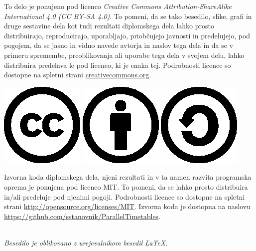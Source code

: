 \documentclass[a4paper,12pt,openany]{book}
\newcommand{\CcImageCc}[1]{%
	\includegraphics[scale=#1]{cc.eps}%
}
\newcommand{\CcImageBy}[1]{%
	\includegraphics[scale=#1]{by.eps}%
}
\newcommand{\CcImageSa}[1]{%
	\includegraphics[scale=#1]{sa.eps}%
}
\begin{document}
\thispagestyle{empty}

\vspace*{5cm}
{\small \noindent
To delo je ponujeno pod licenco \textit{Creative Commons Attribution-ShareAlike International 4.0 (CC BY-SA 4.0)}.
To pomeni, da se tako besedilo, slike, grafi in druge sestavine dela kot tudi rezultati diplomskega dela lahko prosto distribuirajo,
reproducirajo, uporabljajo, priobčujejo javnosti in predelujejo, pod pogojem, da se jasno in vidno navede avtorja in naslov tega
dela in da se v primeru spremembe, preoblikovanja ali uporabe tega dela v svojem delu, lahko distribuira predelava le pod
licenco, ki je enaka tej.
Podrobnosti licence so dostopne na spletni strani \href{http://creativecommons.org/licenses/by-sa/4.0/}{creativecommons.org}.

\begin{center}%
\CcImageCc{0.4}\hspace*{1ex}\CcImageBy{0.4}\hspace*{1ex}\CcImageSa{0.4}%
\end{center}
}

\vspace*{1.5cm}
{\small \noindent
Izvorna koda diplomskega dela, njeni rezultati in v ta namen razvita programska oprema je ponujena pod licenco MIT. To pomeni, da se lahko prosto distribuira in/ali predeluje pod njenimi pogoji.
Podrobnosti licence so dostopne na spletni strani \url{http://opensource.org/licenses/MIT}.
Izvorna koda je dostopna na naslovu \url{https://github.com/sstanovnik/ParallelTimetables}.
}

\begin{center} 
\ \\ \vfill
{\em
Besedilo je oblikovano z urejevalnikom besedil \LaTeX.}
\end{center}
\end{document}
